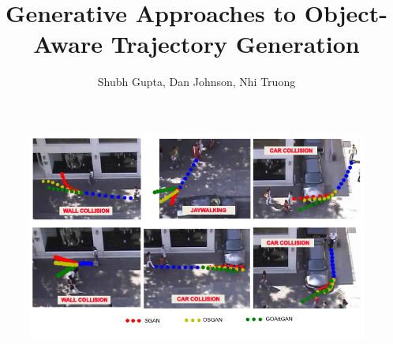 \documentclass[final]{beamer}
\title{\Huge Generative Approaches to Object-Aware Trajectory Generation}
\author{\LARGE Shubh Gupta, Dan Johnson, Nhi Truong}
\institute{\Large Stanford University, CS 236} %
\begin{document}




\begin{frame}[t] %
\vspace*{10cm}
\begin{figure}[H]
	\centering
	\includegraphics[width=.8\linewidth]{allcomp_l}
	\label{fig:}
\end{figure}
\end{frame} %
\end{document}
